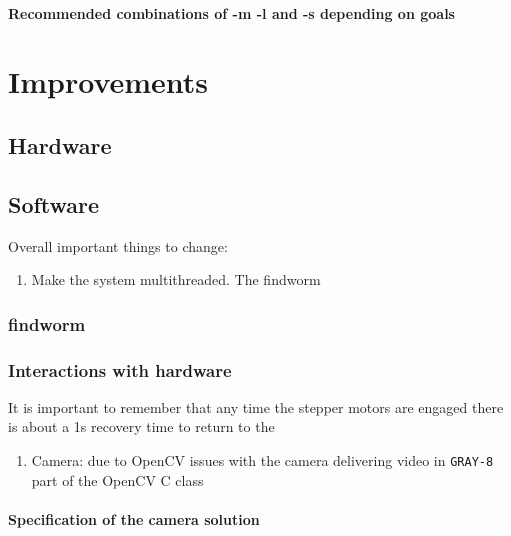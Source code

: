 \documentclass[fullpage]{report}
\begin{document}
\subsubsection{Recommended combinations of -m -l and -s depending on goals}

\chapter{Improvements}
\section{Hardware}
\section{Software}
Overall important things to change:
\begin{enumerate}
\item Make the system multithreaded. The findworm
\end{enumerate}
\subsection{findworm}
\subsection{Interactions with hardware}
It is important to remember that any time the stepper motors are engaged there is about a 1s recovery time to return to the 
\begin{enumerate}
\item Camera: due to OpenCV issues with the camera delivering video in \verb|GRAY-8| part of the OpenCV C class 
\end{enumerate}


\subsubsection{Specification of the camera solution}
\end{document}
